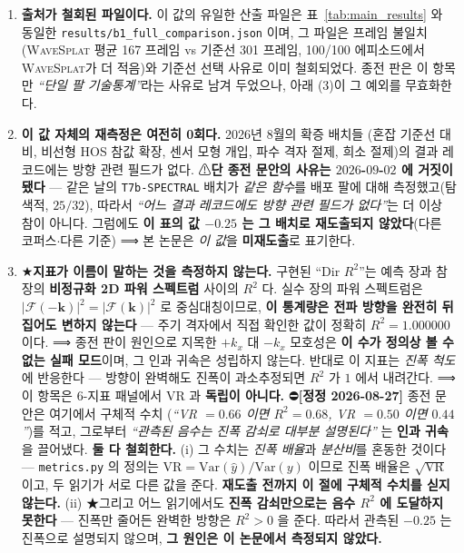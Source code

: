 \documentclass[11pt]{report}
\numberwithin{equation}{chapter}
\numberwithin{figure}{chapter}
\numberwithin{table}{chapter}
\newcommand{\WS}{\textsc{WaveSplat}}
\begin{document}
\begin{enumerate}
  \item \textbf{출처가 철회된 파일이다.} 이 값의 유일한 산출 파일은
        표~\ref{tab:main_results} 와 동일한
        \texttt{results/b1\_full\_comparison.json} 이며, 그 파일은 프레임 불일치
        (\WS{} 평균 167 프레임 vs 기준선 301 프레임, 100/100 에피소드에서 \WS{}가 더 적음)와
        기준선 선택 사유로 이미 철회되었다. 종전 판은 이 항목만
        \emph{``단일 팔 기술통계''}라는 사유로 남겨 두었으나, 아래 (3)이 그 예외를 무효화한다.
  \item \textbf{이 값 자체의 재측정은 여전히 0회다.} 2026년 8월의 확증 배치들
        (혼잡 기준선 대비, 비선형 HOS 참값 확장, 센서 모형 개입, 파수 격자 절제,
        희소 절제)의 결과 레코드에는 방향 관련 필드가 없다.
        ⚠\textbf{단 종전 문안의 사유는 $2026$-$09$-$02$ 에 거짓이 됐다} ---
        같은 날의 \texttt{T7b-SPECTRAL} 배치가 \emph{같은 함수}를 배포 팔에 대해
        측정했고(탐색적, $25/32$), 따라서 \emph{``어느 결과 레코드에도 방향 관련
        필드가 없다''}는 더 이상 참이 아니다. 그럼에도 \textbf{이 표의 값
        $-0.25$ 는 그 배치로 재도출되지 않았다}(다른 코퍼스$\cdot$다른 기준) ⟹
        본 논문은 \emph{이 값}을 \textbf{미재도출}로 표기한다.
  \item ★\textbf{지표가 이름이 말하는 것을 측정하지 않는다.}
        구현된 ``Dir $R^2$''는 예측 장과 참 장의 \textbf{비정규화 2D 파워 스펙트럼}
        사이의 $R^2$ 다. 실수 장의 파워 스펙트럼은
        $|\mathcal{F}(-\mathbf{k})|^2 = |\mathcal{F}(\mathbf{k})|^2$ 로 중심대칭이므로,
        \textbf{이 통계량은 전파 방향을 완전히 뒤집어도 변하지 않는다} ---
        주기 격자에서 직접 확인한 값이 정확히 $R^2 = 1.000000$ 이다.
        ⟹ 종전 판이 원인으로 지목한 $+k_x$ 대 $-k_x$ 모호성은
        \textbf{이 수가 정의상 볼 수 없는 실패 모드}이며, 그 인과 귀속은 성립하지 않는다.
        반대로 이 지표는 \emph{진폭 척도}에 반응한다 --- 방향이 완벽해도 진폭이
        과소추정되면 $R^2$ 가 $1$ 에서 내려간다.
        ⟹ 이 항목은 6-지표 패널에서 VR 과 \textbf{독립이 아니다.}
        ⛔\textbf{[정정 2026-08-27]} 종전 문안은 여기에서 구체적 수치
        (\emph{``VR $=0.66$ 이면 $R^2 = 0.68$, VR $=0.50$ 이면 $0.44$''})를 적고,
        그로부터 \emph{``관측된 음수는 진폭 감쇠로 대부분 설명된다''} 는
        \textbf{인과 귀속}을 끌어냈다. \textbf{둘 다 철회한다.}
        (i) 그 수치는 \emph{진폭 배율}과 \emph{분산비}를 혼동한 것이다 ---
        \texttt{metrics.py} 의 정의는 $\mathrm{VR} = \mathrm{Var}(\hat{y})/\mathrm{Var}(y)$ 이므로
        진폭 배율은 $\sqrt{\mathrm{VR}}$ 이고, 두 읽기가 서로 다른 값을 준다.
        \textbf{재도출 전까지 이 절에 구체적 수치를 싣지 않는다.}
        (ii) ★그리고 어느 읽기에서도 \textbf{진폭 감쇠만으로는 음수 $R^2$ 에 도달하지 못한다}
        --- 진폭만 줄어든 완벽한 방향은 $R^2 > 0$ 을 준다.
        따라서 관측된 $-0.25$ 는 진폭으로 설명되지 않으며,
        \textbf{그 원인은 이 논문에서 측정되지 않았다.}
\end{enumerate}
\end{document}
